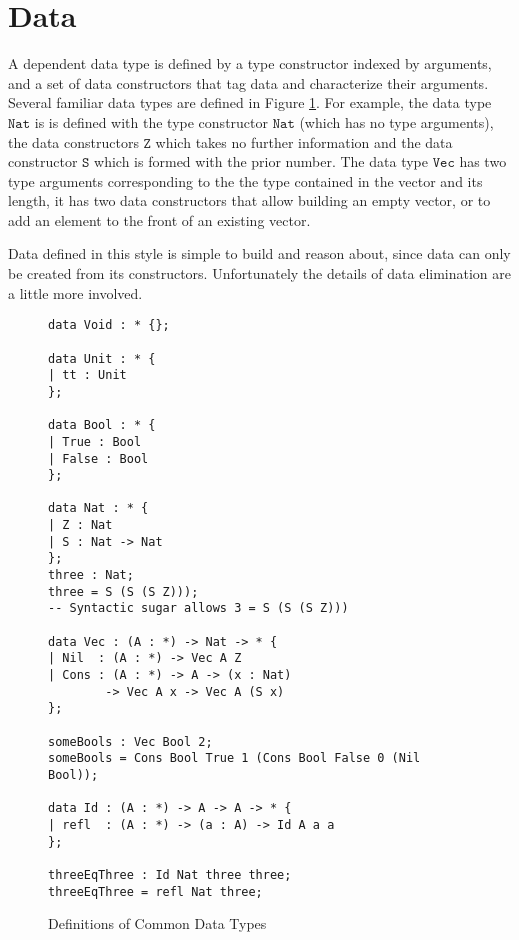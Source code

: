 \section{Data}


A dependent data type is defined by a type constructor indexed by
arguments, and a set of data constructors that tag data and characterize
their arguments. Several familiar data types are defined in Figure
\ref{fig:data-defs}. For example, the data type $\mathtt{Nat}$ is
is defined with the type constructor $\mathtt{Nat}$ (which has no
type arguments), the data constructors $\mathtt{Z}$ which takes no
further information and the data constructor $\mathtt{S}$ which is
formed with the prior number. The data type $\mathtt{Vec}$ has two
type arguments corresponding to the the type contained in the vector
and its length, it has two data constructors that allow building an
empty vector, or to add an element to the front of an existing vector.

Data defined in this style is simple to build and reason about, since
data can only be created from its constructors. Unfortunately the
details of data elimination are a little more involved.

\begin{figure}
\begin{lstlisting}[basicstyle={\ttfamily\small}]
data Void : * {};

data Unit : * {
| tt : Unit
};

data Bool : * {
| True : Bool
| False : Bool
};
 
data Nat : * {
| Z : Nat
| S : Nat -> Nat
};
three : Nat;
three = S (S (S Z)));
-- Syntactic sugar allows 3 = S (S (S Z)))

data Vec : (A : *) -> Nat -> * {
| Nil  : (A : *) -> Vec A Z
| Cons : (A : *) -> A -> (x : Nat)
        -> Vec A x -> Vec A (S x)
};

someBools : Vec Bool 2;
someBools = Cons Bool True 1 (Cons Bool False 0 (Nil Bool));

data Id : (A : *) -> A -> A -> * {
| refl  : (A : *) -> (a : A) -> Id A a a
};

threeEqThree : Id Nat three three;
threeEqThree = refl Nat three;
\end{lstlisting}
 \caption{Definitions of Common Data Types}
\label{fig:data-defs}
\end{figure}
